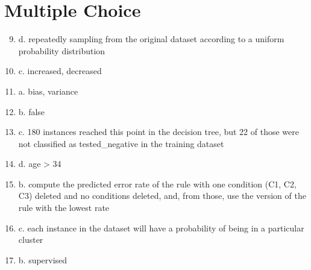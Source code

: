 \documentclass[12pt]{scrartcl}
\begin{document}
\section*{Multiple Choice}
\begin{enumerate}
    \setcounter{enumi}{8}

    \item d. repeatedly sampling from the original dataset according to a uniform probability distribution
    \item c. increased, decreased
    \item a. bias, variance
    \item b. false
    \item c. 180 instances reached this point in the decision tree, but 22 of those were not classified as tested\_negative in the training dataset
    \item d. age > 34
    \item b. compute the predicted error rate of the rule with one condition (C1, C2, C3) deleted and no conditions deleted, and, from those, use the version of the rule with the lowest rate
    \item c. each instance in the dataset will have a probability of being in a particular cluster
    \item b. supervised


\end{enumerate}
\end{document}
